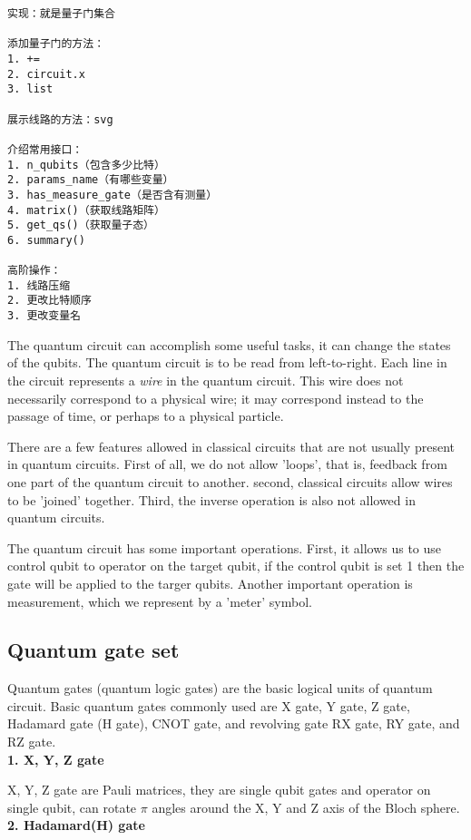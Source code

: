 \begin{lstlisting}
实现：就是量子门集合

添加量子门的方法：
1. +=
2. circuit.x
3. list

展示线路的方法：svg

介绍常用接口：
1. n_qubits（包含多少比特）
2. params_name（有哪些变量）
3. has_measure_gate（是否含有测量）
4. matrix()（获取线路矩阵）
5. get_qs()（获取量子态）
6. summary()

高阶操作：
1. 线路压缩
2. 更改比特顺序
3. 更改变量名
\end{lstlisting}

The quantum circuit can accomplish some useful tasks, it can change the states of the qubits. The quantum circuit is to be read from left-to-right. Each line in the circuit represents a \textit{wire} in the quantum circuit. This wire does not necessarily correspond to a physical wire; it may correspond instead to the passage of time, or perhaps to a physical particle. 

There are a few features allowed in classical circuits that are not usually present in quantum circuits. First of all, we do not allow 'loops', that is, feedback from one part of the quantum circuit to another. second, classical circuits allow wires to be 'joined' together. Third, the inverse operation is also not allowed in quantum circuits.

The quantum circuit has some important operations. First, it allows us to use control qubit to operator on the target qubit, if the control qubit is set 1 then the gate will be applied to the targer qubits. Another important operation is measurement, which we represent by a 'meter' symbol.  
 
\subsection{Quantum gate set}
Quantum gates (quantum logic gates) are the basic logical units of quantum circuit. Basic quantum gates commonly used are X gate, Y gate, Z gate, Hadamard gate (H gate), CNOT gate, and revolving gate RX gate, RY gate, and RZ gate. \\

\textbf{1. X, Y, Z gate}

X, Y, Z gate are Pauli matrices, they are single qubit gates and operator on single qubit, can rotate $\pi$ angles around the X, Y and Z axis of the Bloch sphere.   \\

\textbf{2. Hadamard(H) gate}


